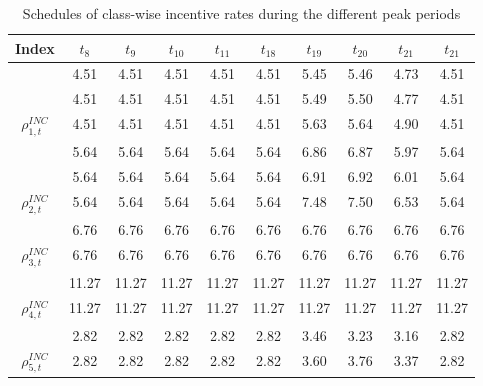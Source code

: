 \documentclass[journal]{IEEEtran}
\begin{document}
\begin{table}[!bt]
	\centering
	\renewcommand{\arraystretch}{1.2}
	\setlength\tabcolsep{3pt}
	\caption{Schedules of class-wise incentive rates during the different peak periods}
	\label{tab: Ch6_optimal price schedule 108}
	\begin{tabular}{cccccccccc}
		\hline
		Index              & $t_8$                            & $t_9$                            & $t_{10}$                           & $t_{11}$                           & $t_{18}$                           & $t_{19}$                           & $t_{20}$                           & $t_{21}$                           & $t_{21}$                           \\ \hline
		  & 4.51  & 4.51  & 4.51  & 4.51  & 4.51  & 5.45  & 5.46  & 4.73  & 4.51 \\
		& 4.51  & 4.51  & 4.51  & 4.51  & 4.51  & 5.49  & 5.50  & 4.77  & 4.51  \\ 
		\multirow{-3}{*}{$\rho_{1,t}^{INC}$} & 4.51  & 4.51  & 4.51  & 4.51  & 4.51  & 5.63  & 5.64  & 4.90  & 4.51  \\ \hline
		& 5.64  & 5.64  & 5.64  & 5.64  & 5.64  & 6.86  & 6.87  & 5.97  & 5.64  \\
		& 5.64  & 5.64  & 5.64  & 5.64  & 5.64  & 6.91  & 6.92  & 6.01  & 5.64  \\ 
		\multirow{-3}{*}{$\rho_{2,t}^{INC}$ } & 5.64  & 5.64  & 5.64  & 5.64  & 5.64  & 7.48  & 7.50  & 6.53  & 5.64  \\ \hline
		& 6.76  & 6.76  & 6.76  & 6.76  & 6.76  & 6.76  & 6.76  & 6.76  & 6.76  \\ 
		\multirow{-2}{*}{$\rho_{3,t}^{INC}$} & 6.76  & 6.76  & 6.76  & 6.76  & 6.76  & 6.76  & 6.76  & 6.76  & 6.76  \\ \hline
		& 11.27 & 11.27 & 11.27 & 11.27 & 11.27 & 11.27 & 11.27 & 11.27 & 11.27 \\ 
		\multirow{-2}{*}{$\rho_{4,t}^{INC}$} & 11.27 & 11.27 & 11.27 & 11.27 & 11.27 & 11.27 & 11.27 & 11.27 & 11.27 \\ \hline
		& 2.82  & 2.82  & 2.82  & 2.82  & 2.82  & 3.46  & 3.23  & 3.16  & 2.82  \\
		\multirow{-2}{*}{$\rho_{5,t}^{INC}$} & 2.82  & 2.82  & 2.82  & 2.82  & 2.82  & 3.60  & 3.76  & 3.37  & 2.82  \\
		\hline
	\end{tabular}
\end{table}
\end{document}
